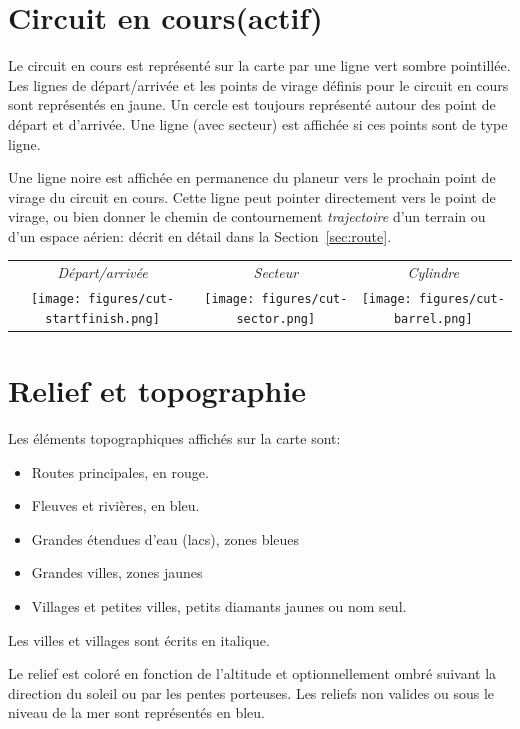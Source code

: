 \section{Circuit en cours(actif)}
Le circuit en cours est représenté sur la carte par une ligne vert sombre pointillée.
Les lignes de départ/arrivée et les points de virage définis pour le circuit en cours sont représentés en jaune.
Un cercle est toujours représenté autour des point de départ et d'arrivée. Une ligne (avec secteur) est affichée si ces points sont de type ligne.

Une ligne noire est affichée en permanence du planeur vers le prochain point de virage du circuit en cours. Cette ligne peut pointer directement vers le point de virage, ou bien donner le chemin  de contournement {\em trajectoire} d'un terrain ou d'un espace aérien: décrit en détail dans la Section~\ref{sec:route}.

\begin{center}
\begin{tabular}{c c c}
{\it Départ/arrivée} & {\it Secteur} & {\it Cylindre} \\
\texttt{[image: figures/cut-startfinish.png]} &
\texttt{[image: figures/cut-sector.png]} &
\texttt{[image: figures/cut-barrel.png]} \\
\end{tabular}
\end{center}

\section{Relief et topographie}\label{sec:terrain_topo}

Les éléments topographiques affichés sur la carte sont:
\begin{itemize}
\item Routes principales, en rouge.
\item Fleuves et rivières, en bleu.
\item Grandes étendues d'eau (lacs), zones bleues
\item Grandes villes, zones jaunes
\item Villages et petites villes, petits diamants jaunes ou nom seul.
\end{itemize}
Les villes et villages sont écrits en italique.

Le relief est coloré en fonction de l'altitude et optionnellement ombré suivant la direction du soleil ou par les pentes porteuses. Les reliefs non valides ou sous le niveau de la mer sont représentés en bleu.

